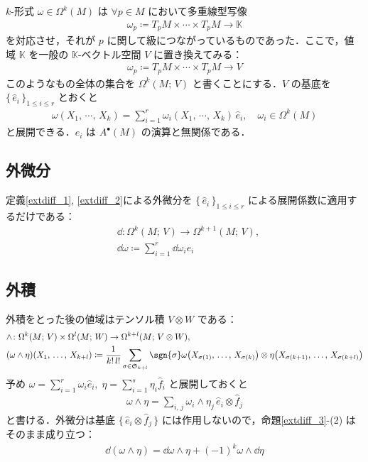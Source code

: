 \documentclass[geometry_main]{subfiles}
\begin{document}
$k$-形式 $\omega \in \Omega^k(M)$ は $\forall p \in M$ において多重線型写像
\begin{align}
	\omega_p \coloneqq T_pM \times \cdots  \times T_pM \to \mathbb{K}
\end{align}
を対応させ，それが $p$ に関して\cinfty 級につながっているものであった．ここで，値域 $\mathbb{K}$ を一般の $\mathbb{K}$-ベクトル空間 $V$ に置き換えてみる：
\begin{align}
	\omega_p \coloneqq T_pM \times \cdots  \times T_pM \to V
\end{align}
このようなもの全体の集合を $\Omega^k(M;\, V)$ と書くことにする．$V$ の基底を $\{\, \hat{e}_i\, \}_{1\le i \le r}$ とおくと
\begin{align}
	\omega(X_1,\, \cdots ,\, X_k) = \sum_{i=1}^r \omega_i(X_1,\, \cdots ,\, X_k)\, \hat{e}_i, \quad \omega_i \in \Omega^k(M)
\end{align}
と展開できる．$\hat{e}_i$ は $A^\bullet(M)$ の演算と無関係である．

\subsection{外微分}

定義\ref{extdiff_1}, \ref{extdiff_2}による外微分を $\{\, \hat{e}_i\, \}_{1\le i \le r}$ による展開係数に適用するだけである：
\begin{align}
	&\dd{} \colon \Omega^k(M;\, V) \to \Omega^{k+1}(M;\, V),\\
	&\dd{\omega} \coloneqq \sum_{i=1}^r \dd{\omega_i} \hat{e}_i
\end{align}

\subsection{外積}

外積をとった後の値域はテンソル積 $V \otimes W$ である：
\begin{align}
	&\wedge \colon \Omega^k(M;\, V) \times \Omega^l(M;\, W) \to \Omega^{k+l}(M;\, V \otimes W),\\
	&(\omega \wedge \eta)(X_1,\, \dots ,\, X_{k+l}) \coloneqq \frac{1}{k!\, l!}\sum_{\sigma \in \mathfrak{S}_{k+l}} \sgn{\sigma} \omega\bigl(X_{\sigma(1)},\, \dots ,\, X_{\sigma(k)}\bigr) \otimes \eta\bigl(X_{\sigma(k+1)},\, \dots ,\, X_{\sigma(k+l)}\bigr)
\end{align}
予め $\omega = \sum_{i=1}^r \omega_i \hat{e}_i,\; \eta = \sum_{i=1}^s \eta_i \hat{f}_i$ と展開しておくと
\begin{align}
	\omega \wedge \eta = \sum_{i,\, j} \omega_i \wedge \eta_j\, \hat{e}_i \otimes \hat{f}_j
\end{align}
と書ける．外微分は基底 $\{\, \hat{e}_i \otimes \hat{f}_j\, \}$ には作用しないので，命題\ref{extdiff_3}-(2) はそのまま成り立つ：
\begin{align}
	\dd{(\omega \wedge \eta)} = \dd{\omega} \wedge \eta + (-1)^k \omega \wedge \dd{\eta}
\end{align}
\end{document}

